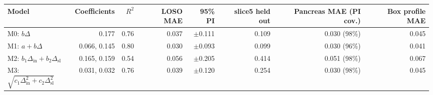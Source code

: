 \begin{tabular}{lrrrrrrr}
\toprule
Model & Coefficients & $R^2$ & LOSO MAE & 95\% PI & slice5 held out & Pancreas MAE (PI cov.) & Box profile MAE \\
\midrule
M0: $b\Delta$ & 0.177 & 0.76 & 0.037 & $\pm$0.111 & 0.109 & 0.030 (98\%) & 0.045 \\
M1: $a+b\Delta$ & 0.066, 0.145 & 0.80 & 0.030 & $\pm$0.093 & 0.099 & 0.030 (96\%) & 0.041 \\
M2: $b_1\Delta_{\mathrm{in}}+b_2\Delta_{\mathrm{sl}}$ & 0.165, 0.159 & 0.54 & 0.056 & $\pm$0.205 & 0.414 & 0.051 (98\%) & 0.067 \\
M3: $\sqrt{c_1\Delta_{\mathrm{in}}^2+c_2\Delta_{\mathrm{sl}}^2}$ & 0.031, 0.032 & 0.76 & 0.039 & $\pm$0.120 & 0.254 & 0.030 (98\%) & 0.045 \\
\bottomrule
\end{tabular}
